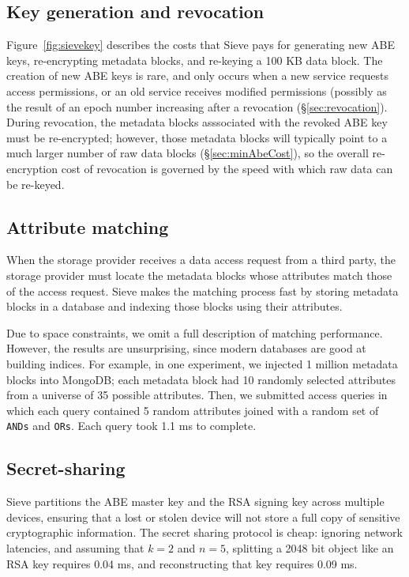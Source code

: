 \subsection{Key generation and revocation}
Figure~\ref{fig:sievekey} describes the costs
that Sieve pays for generating new ABE keys,
re-encrypting metadata blocks, and re-keying
a 100 KB data block. The creation of new ABE
keys is rare, and only occurs when a new service
requests access permissions, or an old service
receives modified permissions (possibly as the
result of an epoch number increasing after a
revocation (\S\ref{sec:revocation}). During
revocation, the metadata blocks asssociated
with the revoked ABE key must be re-encrypted;
however, those metadata blocks will typically
point to a much larger number of raw data
blocks (\S\ref{sec:minAbeCost}), so the overall
re-encryption cost of revocation is governed
by the speed with which raw data can be re-keyed.

\subsection{Attribute matching} When the storage
provider receives a data access request from a
third party, the storage provider must locate
the metadata blocks whose attributes match those
of the access request. Sieve makes the matching
process fast by storing metadata blocks in a
database and indexing those blocks using their
attributes.

Due to space constraints, we omit a full description
of matching performance. However, the results
are unsurprising, since modern databases are good
at building indices. For example, in one experiment,
we injected 1 million metadata blocks into MongoDB;
each metadata block had 10 randomly selected attributes
from a universe of 35 possible attributes. Then, we
submitted access queries in which each query contained
5 random attributes joined with a random set of
\texttt{ANDs} and \texttt{ORs}. Each query took 1.1 ms
to complete.

\subsection{Secret-sharing} Sieve partitions the
ABE master key and the RSA signing key across
multiple devices, ensuring that a lost or stolen
device will not store a full copy of sensitive
cryptographic information. The secret sharing
protocol is cheap: ignoring network latencies,
and assuming that $k=2$ and $n=5$,
splitting a 2048 bit object like an RSA key
requires 0.04 ms, and reconstructing that key
requires 0.09 ms.
